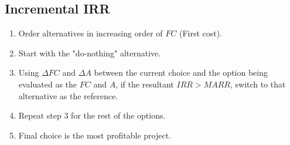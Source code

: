 \subsection{Incremental IRR}
\begin{process}
    \begin{enumerate}
        \item Order alternatives in increasing order of $FC$ (First cost).
        
        \item Start with the "do-nothing" alternative.
        
        \item Using $\Delta FC$ and $\Delta A$ between the current choice and the option being evaluated as the $FC$ and $A$, if the resultant $IRR > MARR$, switch to that alternative as the reference.
        
        \item Repeat step 3 for the rest of the options.
        
        \item Final choice is the most profitable project.
    \end{enumerate}
\end{process}